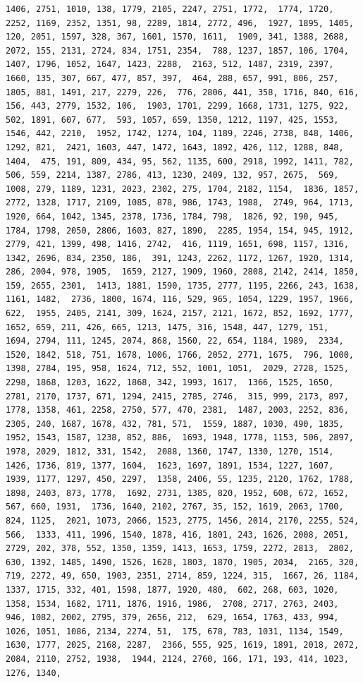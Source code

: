 \documentclass[
]{article}
\begin{document}
\begin{verbatim}
1406, 2751, 1010, 138, 1779, 2105, 2247, 2751, 1772,  1774, 1720, 2252, 1169, 2352, 1351, 98, 2289, 1814, 2772, 496,  1927, 1895, 1405, 120, 2051, 1597, 328, 367, 1601, 1570, 1611,  1909, 341, 1388, 2688, 2072, 155, 2131, 2724, 834, 1751, 2354,  788, 1237, 1857, 106, 1704, 1407, 1796, 1052, 1647, 1423, 2288,  2163, 512, 1487, 2319, 2397, 1660, 135, 307, 667, 477, 857, 397,  464, 288, 657, 991, 806, 257, 1805, 881, 1491, 217, 2279, 226,  776, 2806, 441, 358, 1716, 840, 616, 156, 443, 2779, 1532, 106,  1903, 1701, 2299, 1668, 1731, 1275, 922, 502, 1891, 607, 677,  593, 1057, 659, 1350, 1212, 1197, 425, 1553, 1546, 442, 2210,  1952, 1742, 1274, 104, 1189, 2246, 2738, 848, 1406, 1292, 821,  2421, 1603, 447, 1472, 1643, 1892, 426, 112, 1288, 848, 1404,  475, 191, 809, 434, 95, 562, 1135, 600, 2918, 1992, 1411, 782,  506, 559, 2214, 1387, 2786, 413, 1230, 2409, 132, 957, 2675,  569, 1008, 279, 1189, 1231, 2023, 2302, 275, 1704, 2182, 1154,  1836, 1857, 2772, 1328, 1717, 2109, 1085, 878, 986, 1743, 1988,  2749, 964, 1713, 1920, 664, 1042, 1345, 2378, 1736, 1784, 798,  1826, 92, 190, 945, 1784, 1798, 2050, 2806, 1603, 827, 1890,  2285, 1954, 154, 945, 1912, 2779, 421, 1399, 498, 1416, 2742,  416, 1119, 1651, 698, 1157, 1316, 1342, 2696, 834, 2350, 186,  391, 1243, 2262, 1172, 1267, 1920, 1314, 286, 2004, 978, 1905,  1659, 2127, 1909, 1960, 2808, 2142, 2414, 1850, 159, 2655, 2301,  1413, 1881, 1590, 1735, 2777, 1195, 2266, 243, 1638, 1161, 1482,  2736, 1800, 1674, 116, 529, 965, 1054, 1229, 1957, 1966, 622,  1955, 2405, 2141, 309, 1624, 2157, 2121, 1672, 852, 1692, 1777,  1652, 659, 211, 426, 665, 1213, 1475, 316, 1548, 447, 1279, 151,  1694, 2794, 111, 1245, 2074, 868, 1560, 22, 654, 1184, 1989,  2334, 1520, 1842, 518, 751, 1678, 1006, 1766, 2052, 2771, 1675,  796, 1000, 1398, 2784, 195, 958, 1624, 712, 552, 1001, 1051,  2029, 2728, 1525, 2298, 1868, 1203, 1622, 1868, 342, 1993, 1617,  1366, 1525, 1650, 2781, 2170, 1737, 671, 1294, 2415, 2785, 2746,  315, 999, 2173, 897, 1778, 1358, 461, 2258, 2750, 577, 470, 2381,  1487, 2003, 2252, 836, 2305, 240, 1687, 1678, 432, 781, 571,  1559, 1887, 1030, 490, 1835, 1952, 1543, 1587, 1238, 852, 886,  1693, 1948, 1778, 1153, 506, 2897, 1978, 2029, 1812, 331, 1542,  2088, 1360, 1747, 1330, 1270, 1514, 1426, 1736, 819, 1377, 1604,  1623, 1697, 1891, 1534, 1227, 1607, 1939, 1177, 1297, 450, 2297,  1358, 2406, 55, 1235, 2120, 1762, 1788, 1898, 2403, 873, 1778,  1692, 2731, 1385, 820, 1952, 608, 672, 1652, 567, 660, 1931,  1736, 1640, 2102, 2767, 35, 152, 1619, 2063, 1700, 824, 1125,  2021, 1073, 2066, 1523, 2775, 1456, 2014, 2170, 2255, 524, 566,  1333, 411, 1996, 1540, 1878, 416, 1801, 243, 1626, 2008, 2051,  2729, 202, 378, 552, 1350, 1359, 1413, 1653, 1759, 2272, 2813,  2802, 630, 1392, 1485, 1490, 1526, 1628, 1803, 1870, 1905, 2034,  2165, 320, 719, 2272, 49, 650, 1903, 2351, 2714, 859, 1224, 315,  1667, 26, 1184, 1337, 1715, 332, 401, 1598, 1877, 1920, 480,  602, 268, 603, 1020, 1358, 1534, 1682, 1711, 1876, 1916, 1986,  2708, 2717, 2763, 2403, 946, 1082, 2002, 2795, 379, 2656, 212,  629, 1654, 1763, 433, 994, 1026, 1051, 1086, 2134, 2274, 51,  175, 678, 783, 1031, 1134, 1549, 1630, 1777, 2025, 2168, 2287,  2366, 555, 925, 1619, 1891, 2018, 2072, 2084, 2110, 2752, 1938,  1944, 2124, 2760, 166, 171, 193, 414, 1023, 1276, 1340, 
\end{verbatim}
\end{document}
